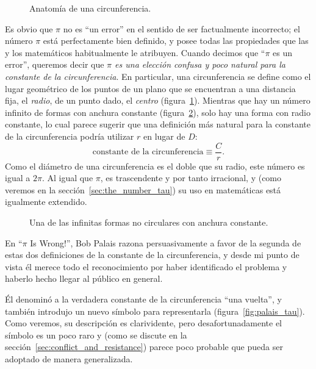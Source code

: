\begin{figure}
\caption{Anatomía de una circunferencia.\label{fig:circle}}
\end{figure}

Es obvio que $\pi$ no es ``un error'' en el sentido de ser factualmente incorrecto; el número $\pi$ está perfectamente bien definido, y posee todas las propiedades que las y los matemáticos habitualmente le atribuyen. Cuando decimos que ``$\pi$ es un error'', queremos decir que \emph{$\pi$ es una elección confusa y poco natural para la constante de la circunferencia}. En particular, una circunferencia se define como el lugar geométrico de los puntos de un plano que se encuentran a una distancia fija, el \emph{radio}, de un punto dado, el \emph{centro} (figura~\ref{fig:circle}). Mientras que hay un número infinito de formas con anchura constante (figura~\ref{fig:constant_width}), solo hay una forma con radio constante, lo cual parece sugerir que una definición más natural para la constante de la circunferencia podría utilizar $r$ en lugar de $D$:
\begin{equation}
\label{eq:circle_constant}
\mbox{constante de la circunferencia} \equiv \frac{C}{r}.
\end{equation}
Como el diámetro de una circunferencia es el doble que su radio, este número es igual a $2\pi$. Al igual que $\pi$, es trascendente y por tanto irracional, y (como veremos en la sección~\ref{sec:the_number_tau}) su uso en matemáticas está igualmente extendido.

\begin{figure}
\caption{Una de las infinitas formas no circulares con anchura constante.\label{fig:constant_width}}
\end{figure}

En ``$\pi$ Is Wrong!'', Bob Palais razona persuasivamente a favor de la segunda de estas dos definiciones de la constante de la circunferencia, y desde mi punto de vista él merece
todo el reconocimiento por haber identificado el problema y haberlo hecho llegar al público en general.

Él denominó a la verdadera constante de la circunferencia ``una vuelta'', y también introdujo un nuevo símbolo para representarla (figura~\ref{fig:palais_tau}). Como veremos, su descripción es clarividente, pero desafortunadamente el símbolo es un poco raro y (como se discute en la sección~\ref{sec:conflict_and_resistance}) parece poco probable que pueda ser adoptado de manera generalizada.

